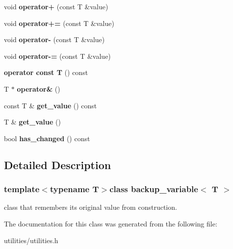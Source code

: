 \begin{DoxyCompactItemize}
\item 
\hypertarget{classbackup__variable_a1ae3f1fcce3725da51aab2879c523a09}{void {\bfseries operator+} (const T \&value)}\label{classbackup__variable_a1ae3f1fcce3725da51aab2879c523a09}

\item 
\hypertarget{classbackup__variable_a4b5753702dbfdaf23f9eb8b210ed80a2}{void {\bfseries operator+=} (const T \&value)}\label{classbackup__variable_a4b5753702dbfdaf23f9eb8b210ed80a2}

\item 
\hypertarget{classbackup__variable_abc321dce84d827d20d69b96653049739}{void {\bfseries operator-\/} (const T \&value)}\label{classbackup__variable_abc321dce84d827d20d69b96653049739}

\item 
\hypertarget{classbackup__variable_adc890d1d8539089e654280bf18e76034}{void {\bfseries operator-\/=} (const T \&value)}\label{classbackup__variable_adc890d1d8539089e654280bf18e76034}

\item 
\hypertarget{classbackup__variable_acba460a7693d0db536d7f9768ab6cf67}{{\bfseries operator const T} () const }\label{classbackup__variable_acba460a7693d0db536d7f9768ab6cf67}

\item 
\hypertarget{classbackup__variable_a61a6e2eee207d52e8f80f23595615627}{T $\ast$ {\bfseries operator\&} ()}\label{classbackup__variable_a61a6e2eee207d52e8f80f23595615627}

\item 
\hypertarget{classbackup__variable_a636435af2389592a1b96038d83582d8a}{const T \& {\bfseries get\-\_\-value} () const }\label{classbackup__variable_a636435af2389592a1b96038d83582d8a}

\item 
\hypertarget{classbackup__variable_a0338d95a730475c9ec88aff25c76b80f}{T \& {\bfseries get\-\_\-value} ()}\label{classbackup__variable_a0338d95a730475c9ec88aff25c76b80f}

\item 
\hypertarget{classbackup__variable_a4d062c1afac850f6e965ccf6ebdca951}{bool {\bfseries has\-\_\-changed} () const }\label{classbackup__variable_a4d062c1afac850f6e965ccf6ebdca951}

\end{DoxyCompactItemize}


\subsection{Detailed Description}
\subsubsection*{template$<$typename T$>$class backup\-\_\-variable$<$ T $>$}

class that remembers its original value from construction. 

The documentation for this class was generated from the following file\-:\begin{DoxyCompactItemize}
\item 
utilities/utilities.\-h\end{DoxyCompactItemize}
